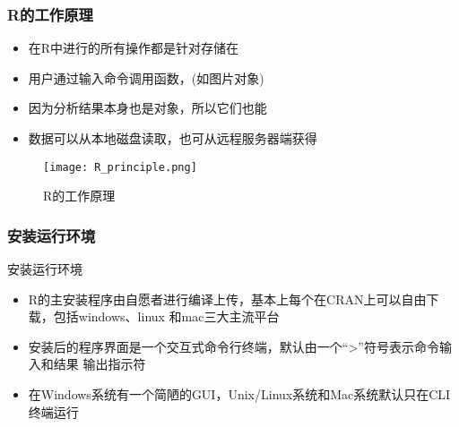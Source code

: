 \subsubsection{R的工作原理}
\begin{frame}[shrink]{\subsecname}{\subsubsecname}
\begin{itemize}
\item 在R中进行的所有操作都是针对存储在
\item 用户通过输入命令调用函数，(如图片对象)
\item 因为分析结果本身也是对象，所以它们也能
\item 数据可以从本地磁盘读取，也可从远程服务器端获得 
\end{itemize} 

\begin{figure}[ht]
  \centering
  \texttt{[image: R\_principle.png]}
  \caption{R的工作原理}
\end{figure}
\end{frame}

\subsubsection{安装运行环境}
\begin{frame}[t]{\subsecname}{安装运行环境}
\begin{itemize}
\item R的主安装程序由自愿者进行编译上传，基本上每个在CRAN上可以自由下载，包括windows、linux
                 和mac三大主流平台
\item 安装后的程序界面是一个交互式命令行终端，默认由一个“>”符号表示命令输入和结果
                 输出指示符
\item 在Windows系统有一个简陋的GUI，Unix/Linux系统和Mac系统默认只在CLI终端运行 
\end{itemize} 

\begin{overlayarea}{\textwidth}{\textheight}


\end{overlayarea}
\end{frame}

